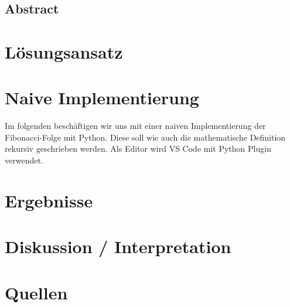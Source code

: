 \documentclass[12pt]{article}
\begin{document}
\subsection{Abstract}

\newpage

\section{Lösungsansatz}

\blindtext

\section{Naive Implementierung}
Im folgenden beschäftigen wir uns mit einer naiven
Implementierung der Fibonacci-Folge mit Python.
Diese soll wie auch die mathematische Definition rekursiv geschrieben werden.
Als Editor wird VS Code mit Python Plugin verwendet. 

\blindtext

\section{Ergebnisse}
\blindtext

\section{Diskussion / Interpretation}
\blindtext

\section{Quellen}
\blindtext
\end{document}
